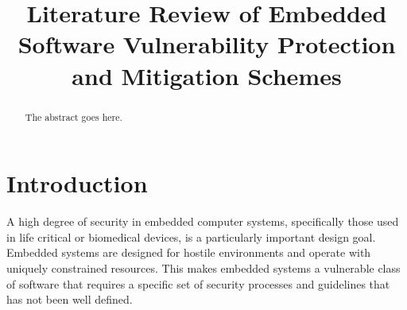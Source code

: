 \documentclass[final,conference,10pt]{IEEEtran}
\begin{document}
%
\title{Literature Review of Embedded Software Vulnerability Protection and Mitigation Schemes}

\author{
}

\maketitle


\begin{abstract}
The abstract goes here.
\end{abstract}

\section{Introduction} 

A high degree of security in embedded computer systems, specifically those used in life critical or biomedical devices, is a particularly important design goal.  Embedded systems are designed for hostile environments and operate with uniquely constrained resources. This makes embedded systems a vulnerable class of software that requires a specific set of security processes and guidelines that has not been well defined.   
\end{document}
